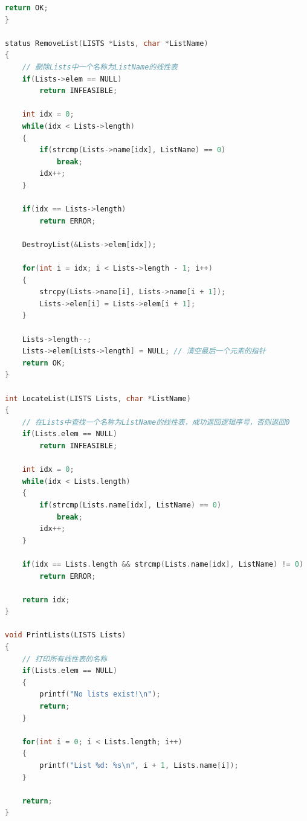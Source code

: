 \documentclass[supercite]{Experimental_Report}
\theoremstyle{definition}
\begin{document}
\begin{lstlisting}[language=C, caption={Lists-Multi.h}, label=lst:lists_multi_h]
    return OK;
}

status RemoveList(LISTS *Lists, char *ListName)
{
    // 删除Lists中一个名称为ListName的线性表
    if(Lists->elem == NULL)
        return INFEASIBLE;
    
    int idx = 0;
    while(idx < Lists->length)
    {
        if(strcmp(Lists->name[idx], ListName) == 0)
            break;
        idx++;
    }
    
    if(idx == Lists->length)
        return ERROR;
    
    DestroyList(&Lists->elem[idx]);
    
    for(int i = idx; i < Lists->length - 1; i++)
    {
        strcpy(Lists->name[i], Lists->name[i + 1]);
        Lists->elem[i] = Lists->elem[i + 1];
    }
    
    Lists->length--;
    Lists->elem[Lists->length] = NULL; // 清空最后一个元素的指针
    return OK;
}

int LocateList(LISTS Lists, char *ListName)
{
    // 在Lists中查找一个名称为ListName的线性表，成功返回逻辑序号，否则返回0
    if(Lists.elem == NULL)
        return INFEASIBLE;
    
    int idx = 0;
    while(idx < Lists.length)
    {
        if(strcmp(Lists.name[idx], ListName) == 0)
            break;
        idx++;
    }
    
    if(idx == Lists.length && strcmp(Lists.name[idx], ListName) != 0)
        return ERROR;
    
    return idx; 
}

void PrintLists(LISTS Lists)
{
    // 打印所有线性表的名称
    if(Lists.elem == NULL)
    {
        printf("No lists exist!\n");
        return;
    }
    
    for(int i = 0; i < Lists.length; i++)
    {
        printf("List %d: %s\n", i + 1, Lists.name[i]);
    }

    return;
}

\end{lstlisting}
\end{document}
